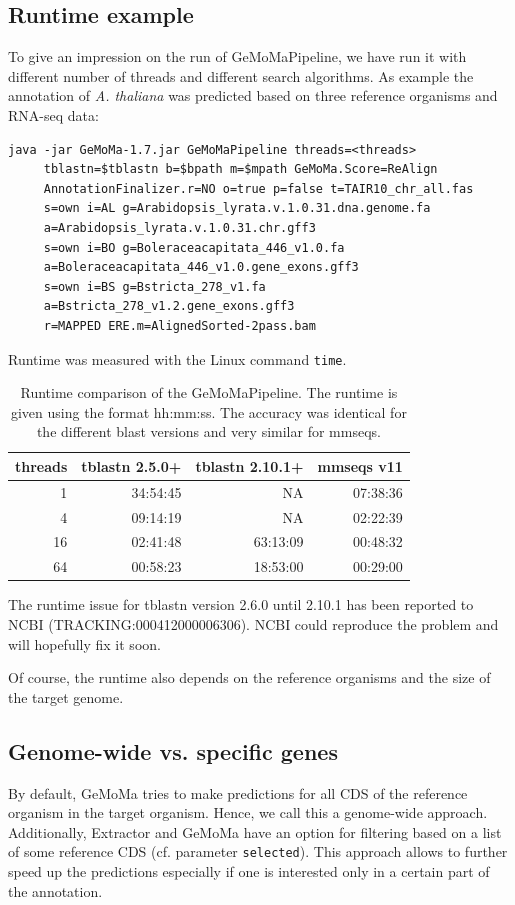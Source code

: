\documentclass{article}
\begin{document}
\subsection{Runtime example}
To give an impression on the run of GeMoMaPipeline, we have run it with different number of threads and different search algorithms.
As example the annotation of \emph{A. thaliana} was predicted based on three reference organisms and RNA-seq data:
\begin{verbatim}
java -jar GeMoMa-1.7.jar GeMoMaPipeline threads=<threads> 
     tblastn=$tblastn b=$bpath m=$mpath GeMoMa.Score=ReAlign
     AnnotationFinalizer.r=NO o=true p=false t=TAIR10_chr_all.fas 
     s=own i=AL g=Arabidopsis_lyrata.v.1.0.31.dna.genome.fa
     a=Arabidopsis_lyrata.v.1.0.31.chr.gff3 
     s=own i=BO g=Boleraceacapitata_446_v1.0.fa
     a=Boleraceacapitata_446_v1.0.gene_exons.gff3
     s=own i=BS g=Bstricta_278_v1.fa
     a=Bstricta_278_v1.2.gene_exons.gff3
     r=MAPPED ERE.m=AlignedSorted-2pass.bam
\end{verbatim}
Runtime was measured with the Linux command \verb+time+.
\begin{table}[ht]\centering
\begin{tabular}{|r||r|r|r|}
\hline
threads	&tblastn 2.5.0+	&tblastn 2.10.1+	&mmseqs v11%
\\
\hline\hline
1	&34:54:45	&NA	&07:38:36\\\hline
4	&09:14:19	&NA	&02:22:39\\\hline
16	&02:41:48	&63:13:09	&00:48:32\\\hline
64	&00:58:23	&18:53:00	&00:29:00\\\hline
\end{tabular}
\caption{
Runtime comparison of the GeMoMaPipeline. The runtime is given using the format hh:mm:ss.
The accuracy was identical for the different blast versions and very similar for mmseqs.
}
\end{table}
The runtime issue for tblastn version 2.6.0 until 2.10.1 has been reported to NCBI (TRACKING:000412000006306). NCBI could reproduce the problem and will hopefully fix it soon.

Of course, the runtime also depends on the reference organisms and the size of the target genome.


\subsection{Genome-wide vs. specific genes}
By default, GeMoMa tries to make predictions for all CDS of the reference organism in the target organism. Hence, we call this a genome-wide approach. Additionally, Extractor and GeMoMa have an option for filtering based on a list of some reference CDS (cf. parameter \texttt{selected}). This approach allows to further speed up the predictions especially if one is interested only in a certain part of the annotation.
\end{document}
